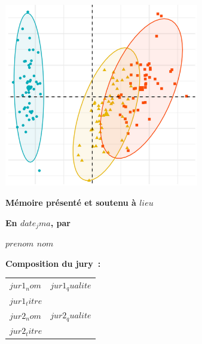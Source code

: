 \documentclass[12pt,a4paper]{reedthesis}
\begin{document}
\begin{titlepage}
\vspace{10mm}

\begin{center}
\includegraphics[height=8cm]{logos/accueil.png}
\end{center}

\vspace{10mm}

\textbf{Mémoire présenté et soutenu à $lieu$}

\textbf{En $date_jma$, par}

\Large {\color{Prune} \textbf{$prenom$ $nom$}}

\vspace{15mm}

\flushleft \normalsize \textbf{Composition du jury~:}
\bigskip

\scriptsize
{}
\begin{tabular}{|p{4cm}l}
\textbf{$jur1_nom$} &  $jur1_qualite$\\
$jur1_titre$ & \\
\textbf{$jur2_nom$} &  $jur2_qualite$\\
$jur2_titre$ & \\
\end{tabular}


\end{titlepage}
\end{document}
